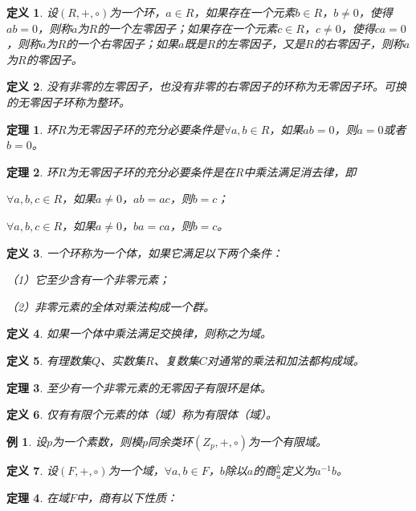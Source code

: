 \documentclass{article}
\newtheorem{Def}{定义}
\newtheorem{Thm}{定理}
\newtheorem*{Example}{例}
\begin{document}
\begin{CJK*}{UTF8}{gbsn}
\begin{Def}
  设$(R,+,\circ)$为一个环，$a\in R$，如果存在一个元素$b\in R$，$b\neq 0$，使得$ab=0$，则称$a$为$R$的一个左零因子；如果存在一个元素$c\in R$，$c\neq 0$，使得$ca=0$，则称$a$为$R$的一个右零因子；如果$a$既是$R$的左零因子，又是$R$的右零因子，则称$a$为$R$的零因子。
\end{Def}

\begin{Def}
  没有非零的左零因子，也没有非零的右零因子的环称为无零因子环。可换的无零因子环称为整环。
\end{Def}

\begin{Thm}
  环$R$为无零因子环的充分必要条件是$\forall a,b \in R$，如果$ab=0$，则$a=0$或者$b=0$。
\end{Thm}

\begin{Thm}
  环$R$为无零因子环的充分必要条件是在$R$中乘法满足消去律，即

  $\forall a,b,c\in R$，如果$a\neq 0$，$ab=ac$，则$b=c$；

  $\forall a,b,c\in R$，如果$a\neq 0$，$ba=ca$，则$b=c$。

\end{Thm}

\begin{Def}
  一个环称为一个体，如果它满足以下两个条件：

  （1）它至少含有一个非零元素；

  （2）非零元素的全体对乘法构成一个群。
\end{Def}

\begin{Def}
  如果一个体中乘法满足交换律，则称之为域。
\end{Def}
\begin{Def}
  有理数集$Q$、实数集$R$、复数集$C$对通常的乘法和加法都构成域。
\end{Def}
\begin{Thm}
  至少有一个非零元素的无零因子有限环是体。
\end{Thm}
\begin{Def}
  仅有有限个元素的体（域）称为有限体（域）。
\end{Def}
\begin{Example}
  设$p$为一个素数，则模$p$同余类环$(Z_p,+,\circ)$为一个有限域。
\end{Example}
\begin{Def}
  设$(F,+,\circ)$为一个域，$\forall a,b\in F$，$b$除以$a$的商$\frac{b}{a}$定义为$a^{-1}b$。
\end{Def}
\begin{Thm}
  在域$F$中，商有以下性质：


\end{Thm}
\end{CJK*}
\end{document}

